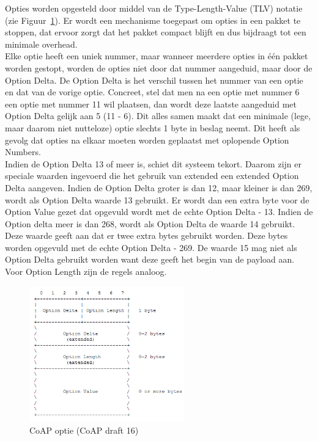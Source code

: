Opties worden opgesteld door middel van de Type-Length-Value (TLV) notatie (zie Figuur~\ref{fig:CoAPOpties}). Er wordt een mechanisme toegepast om opties in een pakket te stoppen, dat ervoor zorgt dat het pakket compact blijft en dus bijdraagt tot een minimale overhead.\\

Elke optie heeft een uniek nummer, maar wanneer meerdere opties in \'{e}\'{e}n pakket worden gestopt, worden de opties niet door dat nummer aangeduid, maar door de Option Delta. De Option Delta is het verschil tussen het nummer van een optie en dat van de vorige optie.
Concreet, stel dat men na een optie met nummer 6 een optie met nummer 11 wil plaatsen, dan wordt deze laatste aangeduid met Option Delta gelijk aan 5 (11 - 6). Dit alles samen maakt dat een minimale (lege, maar daarom niet nutteloze) optie slechts 1 byte in beslag neemt. Dit heeft als gevolg dat opties na elkaar moeten worden geplaatst met oplopende Option Numbers.\\

Indien de Option Delta 13 of meer is, schiet dit systeem tekort. Daarom zijn er speciale waarden ingevoerd die het gebruik van extended een extended Option Delta aangeven. Indien de Option Delta groter is dan 12, maar kleiner is dan 269, wordt als Option Delta waarde 13 gebruikt. Er wordt dan een extra byte voor de Option Value gezet dat opgevuld wordt met de echte Option Delta - 13. Indien de Option delta meer is dan 268, wordt als Option Delta de waarde 14 gebruikt. Deze waarde geeft aan dat er twee extra bytes gebruikt worden. Deze bytes worden opgevuld met de echte Option Delta - 269. De waarde 15 mag niet als Option Delta gebruikt worden want deze geeft het begin van de payload aan. Voor Option Length zijn de regels analoog.


\begin{figure}[h]
\centering
\includegraphics[width=0.6\textwidth]{fig/CoAPOpties}
\vspace{-10pt}
\caption{CoAP optie (CoAP draft 16)}
\label{fig:CoAPOpties}
\end{figure}

